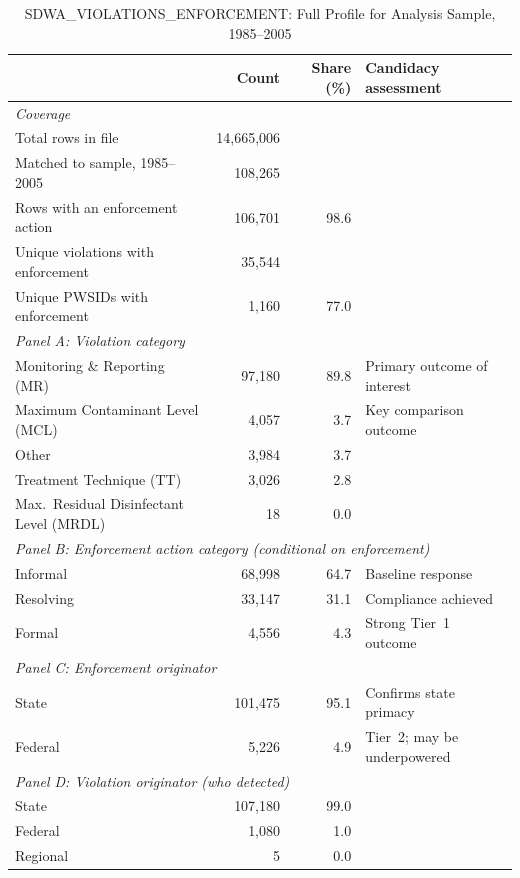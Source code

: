 \begin{table}[h!]
\centering
\caption{SDWA\_VIOLATIONS\_ENFORCEMENT: Full Profile for Analysis Sample, 1985--2005}
\label{tab:profile_enforcement}
\small
\begin{tabular}{p{5.5cm}rrl}
\hline\hline
 & Count & Share (\%) & Candidacy assessment \\
\hline
\multicolumn{4}{l}{\textit{Coverage}} \\
Total rows in file & 14,665,006 & & \\
Matched to sample, 1985--2005 & 108,265 & & \\
Rows with an enforcement action & 106,701 & 98.6 & \\
Unique violations with enforcement & 35,544 & & \\
Unique PWSIDs with enforcement & 1,160 & 77.0 & \\[6pt]

\multicolumn{4}{l}{\textit{Panel A: Violation category}} \\
Monitoring \& Reporting (MR) & 97,180 & 89.8 & Primary outcome of interest \\
Maximum Contaminant Level (MCL) & 4,057 & 3.7 & Key comparison outcome \\
Other & 3,984 & 3.7 & \\
Treatment Technique (TT) & 3,026 & 2.8 & \\
Max.\ Residual Disinfectant Level (MRDL) & 18 & 0.0 & \\[6pt]

\multicolumn{4}{l}{\textit{Panel B: Enforcement action category (conditional on enforcement)}} \\
Informal & 68,998 & 64.7 & Baseline response \\
Resolving & 33,147 & 31.1 & Compliance achieved \\
Formal & 4,556 & 4.3 & Strong Tier~1 outcome \\[6pt]

\multicolumn{4}{l}{\textit{Panel C: Enforcement originator}} \\
State & 101,475 & 95.1 & Confirms state primacy \\
Federal & 5,226 & 4.9 & Tier~2; may be underpowered \\[6pt]

\multicolumn{4}{l}{\textit{Panel D: Violation originator (who detected)}} \\
State & 107,180 & 99.0 & \\
Federal & 1,080 & 1.0 & \\
Regional & 5 & 0.0 & \\[6pt]


\end{tabular}
\end{table}
